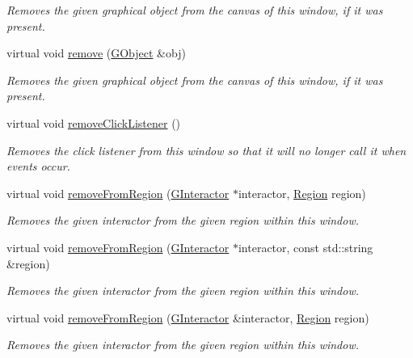 \begin{DoxyCompactItemize}
\begin{DoxyCompactList}\small\item\em Removes the given graphical object from the canvas of this window, if it was present. \end{DoxyCompactList}\item 
virtual void \mbox{\hyperlink{classsgl_1_1GWindow_a37cf4a26853ac22c5e3a21335dfc7ac9}{remove}} (\mbox{\hyperlink{classsgl_1_1GObject}{G\+Object}} \&obj)
\begin{DoxyCompactList}\small\item\em Removes the given graphical object from the canvas of this window, if it was present. \end{DoxyCompactList}\item 
virtual void \mbox{\hyperlink{classsgl_1_1GWindow_ad39d0325cde6b97ebda4b9d7787c633b}{remove\+Click\+Listener}} ()
\begin{DoxyCompactList}\small\item\em Removes the click listener from this window so that it will no longer call it when events occur. \end{DoxyCompactList}\item 
virtual void \mbox{\hyperlink{classsgl_1_1GWindow_a87a74b040025878283ba685e30d5104f}{remove\+From\+Region}} (\mbox{\hyperlink{classsgl_1_1GInteractor}{G\+Interactor}} $\ast$interactor, \mbox{\hyperlink{classsgl_1_1GWindow_a81a01a86de31071a92e6cce0bab9bc4b}{Region}} region)
\begin{DoxyCompactList}\small\item\em Removes the given interactor from the given region within this window. \end{DoxyCompactList}\item 
virtual void \mbox{\hyperlink{classsgl_1_1GWindow_a16268c8344a5a5d9b10bde95764112d1}{remove\+From\+Region}} (\mbox{\hyperlink{classsgl_1_1GInteractor}{G\+Interactor}} $\ast$interactor, const std\+::string \&region)
\begin{DoxyCompactList}\small\item\em Removes the given interactor from the given region within this window. \end{DoxyCompactList}\item 
virtual void \mbox{\hyperlink{classsgl_1_1GWindow_afee7b65f917c4f6a0fdb1c8ea75406a5}{remove\+From\+Region}} (\mbox{\hyperlink{classsgl_1_1GInteractor}{G\+Interactor}} \&interactor, \mbox{\hyperlink{classsgl_1_1GWindow_a81a01a86de31071a92e6cce0bab9bc4b}{Region}} region)
\begin{DoxyCompactList}\small\item\em Removes the given interactor from the given region within this window. \end{DoxyCompactList}\item 

\end{DoxyCompactItemize}

